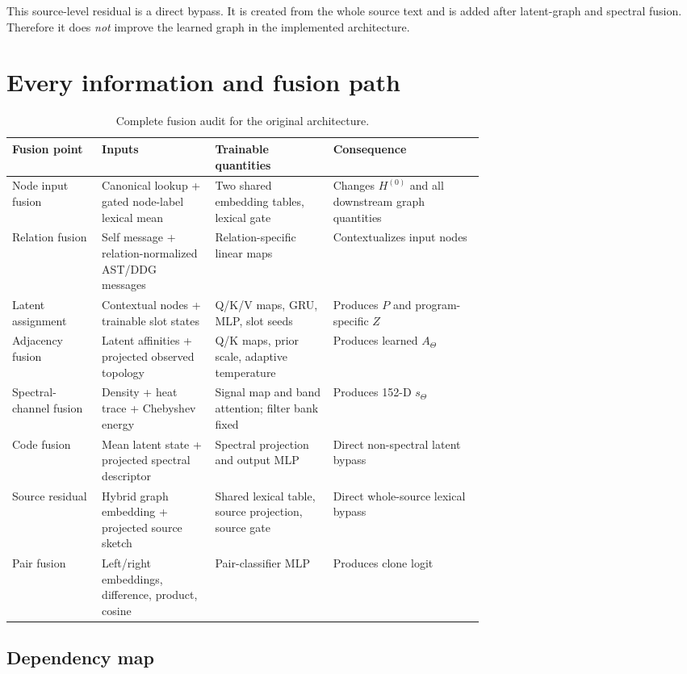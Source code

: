 \documentclass[11pt,a4paper]{article}
\begin{document}
This source-level residual is a direct bypass. It is created from the whole
source text and is added after latent-graph and spectral fusion. Therefore it
does \emph{not} improve the learned graph in the implemented architecture.

\section{Every information and fusion path}

\begin{table}[H]
\centering
\footnotesize
\begin{tabularx}{\linewidth}{@{}p{0.19\linewidth}p{0.24\linewidth}p{0.25\linewidth}X@{}}
\toprule
Fusion point & Inputs & Trainable quantities & Consequence \\
\midrule
Node input fusion & Canonical lookup + gated node-label lexical mean & Two shared embedding tables, lexical gate & Changes $H^{(0)}$ and all downstream graph quantities \\
Relation fusion & Self message + relation-normalized AST/DDG messages & Relation-specific linear maps & Contextualizes input nodes \\
Latent assignment & Contextual nodes + trainable slot states & Q/K/V maps, GRU, MLP, slot seeds & Produces $P$ and program-specific $Z$ \\
Adjacency fusion & Latent affinities + projected observed topology & Q/K maps, prior scale, adaptive temperature & Produces learned $A_\Theta$ \\
Spectral-channel fusion & Density + heat trace + Chebyshev energy & Signal map and band attention; filter bank fixed & Produces 152-D $s_\Theta$ \\
Code fusion & Mean latent state + projected spectral descriptor & Spectral projection and output MLP & Direct non-spectral latent bypass \\
Source residual & Hybrid graph embedding + projected source sketch & Shared lexical table, source projection, source gate & Direct whole-source lexical bypass \\
Pair fusion & Left/right embeddings, difference, product, cosine & Pair-classifier MLP & Produces clone logit \\
\bottomrule
\end{tabularx}
\caption{Complete fusion audit for the original architecture.}
\end{table}

\subsection{Dependency map}
\end{document}
